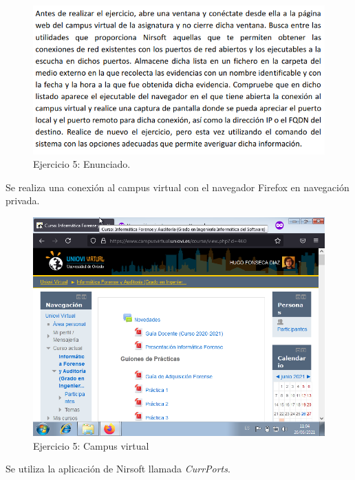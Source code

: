 \documentclass[11pt]{article}
\begin{document}
\begin{figure}[H]
    \caption{Ejercicio 5: Enunciado.}
  \centering
  \includegraphics[scale=0.7]{other/enunciado_p05_e5.png}
\end{figure}

Se realiza una conexión al campus virtual con el navegador Firefox en navegación privada.

\begin{figure}[H]
  \caption{Ejercicio 5: Campus virtual}
  \centering
    \includegraphics[scale=0.7]{p05/e5-1.png}
\end{figure}

Se utiliza la aplicación de Nirsoft llamada \textit{CurrPorts}.
\end{document}
